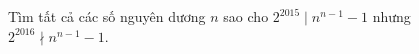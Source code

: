 \ifshowproblem
\begin{problem}[\gls{BW 2015}/P17]\label{example:BW-2015-P17}
    Tìm tất cả các số nguyên dương \( n \) sao cho \( 2^{2015} \mid n^{n-1} - 1 \) nhưng \( 2^{2016} \nmid n^{n-1} - 1 \).
\end{problem}
\fi

\footnotemark
{}
\fi